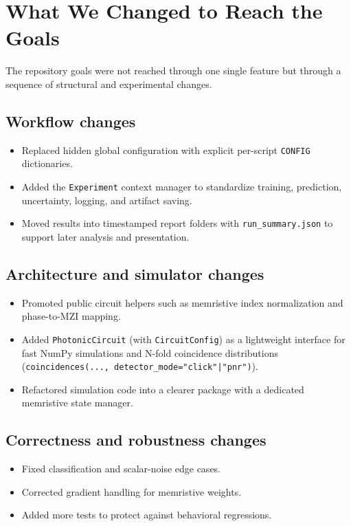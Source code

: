 \documentclass[11pt,a4paper]{article}
\begin{document}
\section{What We Changed to Reach the Goals}

The repository goals were not reached through one single feature but through a sequence of structural and experimental changes.

\subsection{Workflow changes}
\begin{itemize}[leftmargin=*]
    \item Replaced hidden global configuration with explicit per-script \texttt{CONFIG} dictionaries.
    \item Added the \texttt{Experiment} context manager to standardize training, prediction, uncertainty, logging, and artifact saving.
    \item Moved results into timestamped report folders with \texttt{run\_summary.json} to support later analysis and presentation.
\end{itemize}

\subsection{Architecture and simulator changes}
\begin{itemize}[leftmargin=*]
    \item Promoted public circuit helpers such as memristive index normalization and phase-to-MZI mapping.
    \item Added \texttt{PhotonicCircuit} (with \texttt{CircuitConfig}) as a lightweight interface for fast NumPy simulations and N-fold coincidence distributions (\texttt{coincidences(..., detector\_mode="click"|"pnr")}).
    \item Refactored simulation code into a clearer package with a dedicated memristive state manager.
\end{itemize}

\subsection{Correctness and robustness changes}
\begin{itemize}[leftmargin=*]
    \item Fixed classification and scalar-noise edge cases.
    \item Corrected gradient handling for memristive weights.
    \item Added more tests to protect against behavioral regressions.
\end{itemize}
\end{document}
